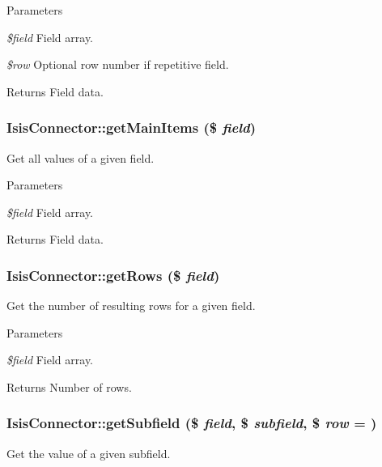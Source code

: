 \begin{DoxyParams}{Parameters}
\item[{\em \$field}]Field array.\item[{\em \$row}]Optional row number if repetitive field.\end{DoxyParams}
\begin{DoxyReturn}{Returns}
Field data. 
\end{DoxyReturn}
\hypertarget{classIsisConnector_a2bace7162ec3bf49df9f7acd9367c360}{
\subsubsection[{getMainItems}]{\setlength{\rightskip}{0pt plus 5cm}IsisConnector::getMainItems (\$ {\em field})}}
\label{classIsisConnector_a2bace7162ec3bf49df9f7acd9367c360}
Get all values of a given field.


\begin{DoxyParams}{Parameters}
\item[{\em \$field}]Field array.\end{DoxyParams}
\begin{DoxyReturn}{Returns}
Field data. 
\end{DoxyReturn}
\hypertarget{classIsisConnector_a0d1ebc176fe54568044aae02d7932c9b}{
\subsubsection[{getRows}]{\setlength{\rightskip}{0pt plus 5cm}IsisConnector::getRows (\$ {\em field})}}
\label{classIsisConnector_a0d1ebc176fe54568044aae02d7932c9b}
Get the number of resulting rows for a given field.


\begin{DoxyParams}{Parameters}
\item[{\em \$field}]Field array.\end{DoxyParams}
\begin{DoxyReturn}{Returns}
Number of rows. 
\end{DoxyReturn}
\hypertarget{classIsisConnector_a1ddaff24266ee02d652de9a752c1be8e}{
\subsubsection[{getSubfield}]{\setlength{\rightskip}{0pt plus 5cm}IsisConnector::getSubfield (\$ {\em field}, \/  \$ {\em subfield}, \/  \$ {\em row} = {})}}
\label{classIsisConnector_a1ddaff24266ee02d652de9a752c1be8e}
Get the value of a given subfield.


